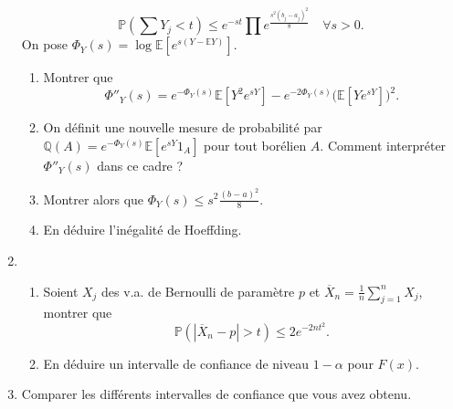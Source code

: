 \documentclass[a4paper]{article}
\begin{document}
\begin{enumerate}
\[\mathbb P(\sum Y_j <t )\leq e^{-st}\prod e^{\frac{s^2(b_j-a_j)^2}{8}}\quad\forall s >0.\]
On pose $\Phi_Y(s)=\log \mathbb E[e^{s(Y-\mathbb E Y)}]$. 
	\begin{enumerate}
	\item Montrer que \[\Phi''_Y(s)=e^{-\Phi_Y(s)}\mathbb E[Y^2 e^{sY}]-e^{-2\Phi_Y(s)}\mathbb (\mathbb E[Ye^{sY}])^2.\]
	\item On définit une nouvelle mesure de probabilité par $\mathbb Q(A)= e^{-\Phi_Y(s)}\mathbb E[e^{sY}1_A]$ pour tout borélien $A$. Comment interpréter $ \Phi''_Y(s)$ dans ce cadre ?
	\item Montrer alors que $\Phi_Y(s)\leq s^2 \frac{(b-a)^2}{8}$.
	\item En déduire l'inégalité de Hoeffding.
	\end{enumerate}

\item \begin{enumerate}
	\item Soient $X_j$ des v.a. de Bernoulli de paramètre $p$ et $\overline X_n = \frac{1}{n}\sum_{j=1}^n X_j$, montrer que 
		\[\mathbb P(|\overline X_n-p|>t)\leq 2e^{-2nt^2}.\] 
	\item En déduire un intervalle de confiance de niveau $1-\alpha$ pour $F(x)$.
	\end{enumerate}
\item Comparer les différents intervalles de confiance que vous avez obtenu.
\end{enumerate}
\end{document}
